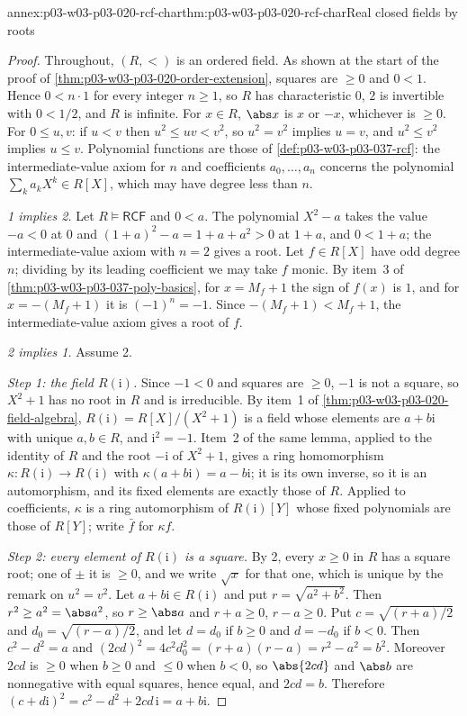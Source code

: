 \begin{annexitem}{annex:p03-w03-p03-020-rcf-char}{thm:p03-w03-p03-020-rcf-char}{Real closed fields by roots}
\begin{proof}
Throughout, \((R,<)\) is an ordered field. As shown at the start of the
proof of \cref{thm:p03-w03-p03-020-order-extension}, squares are \(\ge0\)
and \(0<1\). Hence \(0<n\cdot1\) for every integer \(n\ge1\), so \(R\) has
characteristic \(0\), \(2\) is invertible with \(0<1/2\), and \(R\) is
infinite. For \(x\in R\), \(\abs x\) is \(x\) or \(-x\), whichever is
\(\ge0\). For \(0\le u,v\): if \(u<v\) then \(u^2\le uv<v^2\), so
\(u^2=v^2\) implies \(u=v\), and \(u^2\le v^2\) implies \(u\le v\).
Polynomial functions are those of \cref{def:p03-w03-p03-037-rcf}: the
intermediate-value axiom for \(n\) and coefficients \(a_0,\ldots,a_n\)
concerns the polynomial \(\sum_ka_kX^k\in R[X]\), which may have degree
less than \(n\).

\emph{1 implies 2.} Let \(R\models\mathsf{RCF}\) and \(0<a\). The
polynomial \(X^2-a\) takes the value \(-a<0\) at \(0\) and
\((1+a)^2-a=1+a+a^2>0\) at \(1+a\), and \(0<1+a\); the intermediate-value
axiom with \(n=2\) gives a root. Let \(f\in R[X]\) have odd degree \(n\);
dividing by its leading coefficient we may take \(f\) monic. By item~3 of
\cref{thm:p03-w03-p03-037-poly-basics}, for \(x=M_f+1\) the sign of \(f(x)\)
is \(1\), and for \(x=-(M_f+1)\) it is \((-1)^n=-1\). Since
\(-(M_f+1)<M_f+1\), the intermediate-value axiom gives a root of \(f\).

\emph{2 implies 1.} Assume 2.

\emph{Step 1: the field \(R(\mathrm i)\).} Since \(-1<0\) and squares are
\(\ge0\), \(-1\) is not a square, so \(X^2+1\) has no root in \(R\) and is
irreducible. By item~1 of \cref{thm:p03-w03-p03-020-field-algebra},
\(R(\mathrm i)=R[X]/(X^2+1)\) is a field whose elements are
\(a+b\mathrm i\) with unique \(a,b\in R\), and \(\mathrm i^2=-1\). Item~2 of
the same lemma, applied to the identity of \(R\) and the root
\(-\mathrm i\) of \(X^2+1\), gives a ring homomorphism
\(\kappa:R(\mathrm i)\to R(\mathrm i)\) with
\(\kappa(a+b\mathrm i)=a-b\mathrm i\); it is its own inverse, so it is an
automorphism, and its fixed elements are exactly those of \(R\). Applied to
coefficients, \(\kappa\) is a ring automorphism of \(R(\mathrm i)[Y]\)
whose fixed polynomials are those of \(R[Y]\); write \(\bar f\) for
\(\kappa f\).

\emph{Step 2: every element of \(R(\mathrm i)\) is a square.} By 2, every
\(x\ge0\) in \(R\) has a square root; one of \(\pm\) it is \(\ge0\), and we
write \(\sqrt x\) for that one, which is unique by the remark on
\(u^2=v^2\). Let \(a+b\mathrm i\in R(\mathrm i)\) and put
\(r=\sqrt{a^2+b^2}\). Then \(r^2\ge a^2=\abs a^2\), so \(r\ge\abs a\) and
\(r+a\ge0\), \(r-a\ge0\). Put \(c=\sqrt{(r+a)/2}\) and
\(d_0=\sqrt{(r-a)/2}\), and let \(d=d_0\) if \(b\ge0\) and \(d=-d_0\) if
\(b<0\). Then \(c^2-d^2=a\) and \((2cd)^2=4c^2d_0^2=(r+a)(r-a)=r^2-a^2=b^2\).
Moreover \(2cd\) is \(\ge0\) when \(b\ge0\) and \(\le0\) when \(b<0\), so
\(\abs{2cd}\) and \(\abs b\) are nonnegative with equal squares, hence equal,
and \(2cd=b\). Therefore
\((c+d\mathrm i)^2=c^2-d^2+2cd\,\mathrm i=a+b\mathrm i\).


\end{proof}
\end{annexitem}
